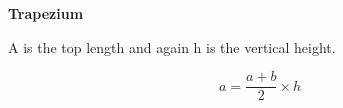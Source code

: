 \item{\textbf{Trapezium}}

A is the top length and again h is the vertical height.

$$ a = \frac{a + b}{2} \times h $$
